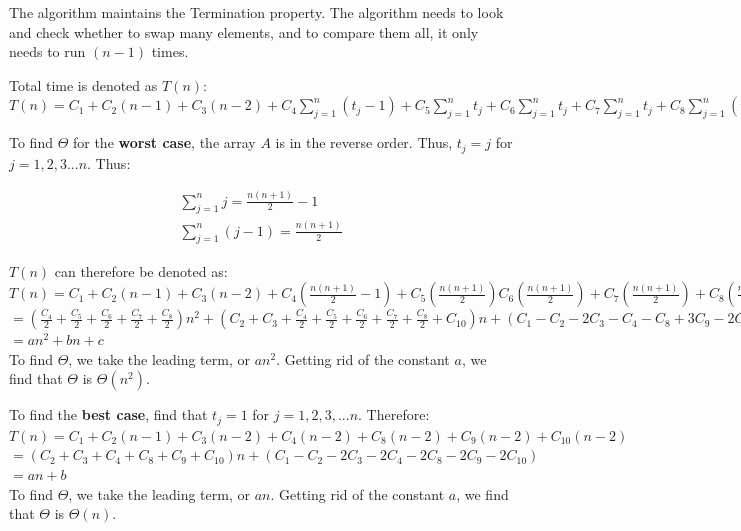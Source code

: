 \documentclass[11pt,letterpaper]{article}
\begin{document}
The algorithm maintains the Termination property. The algorithm needs to look and check whether to swap
many elements, and to compare them all, it only needs to run $ (n - 1) $ times.

Total time is denoted as $T(n)$:\\
$
	T(n)		= C_1 + C_2(n-1) + C_3(n-2) + C_4\sum_{j=1}^{n} (t_j - 1) + C_5\sum_{j=1}^{n} t_j
			+ C_6\sum_{j=1}^{n} t_j + C_7\sum_{j=1}^{n} t_j + C_8\sum_{j=1}^{n} (t_j - 1) + C_9(n-2) + C_{10}(n-2)
$

To find $ \Theta $ for the \textbf{worst case}, the array $ A $ is in the reverse order. Thus, $ t_j = j $ 
for $ j = 1, 2, 3... n $. Thus:

\begin{eqnarray}
	\sum_{j = 1}^{n} j = \frac{n ( n + 1 ) }{2} - 1 \\
	\sum_{j = 1}^{n} (j - 1) = \frac{n ( n + 1 ) }{2}
\end{eqnarray}

$T(n)$ can therefore be denoted as:\\
$
	T(n)		= C_1 + C_2(n-1) + C_3(n-2) + C_4( \frac{n(n+1)}{2} - 1) + C_5( \frac{n(n+1)}{2})
			C_6( \frac{n(n+1)}{2}) + C_7( \frac{n(n+1)}{2}) + C_8( \frac{n(n+1)}{2} - 1) + C_9(n-2) + C_{10}(n-2)
$ \\
$
= 	( \frac{C_4}{2} + \frac{C_5}{2} + \frac{C_6}{2} + \frac{C_7}{2} + \frac{C_8}{2} ) n^2
+	( C_2 + C_3 + \frac{C_4}{2} + \frac{C_5}{2} + \frac{C_6}{2} + \frac{C_7}{2} + \frac{C_8}{2} + C_{10}) n
+	( C_1 - C_2 - 2C_3 - C_4 - C_8 + 3C_9 - 2C_{10})
$\\
$
= an^2 + bn + c
$\\

To find $\Theta$, we take the leading term, or $an^2$. Getting rid of the constant $a$, we find that 
$\Theta$ is $\Theta(n^2)$.

To find the \textbf{best case}, find that $t_j = 1 $ for $ j = 1, 2, 3, ... n $. Therefore: \\
$
	T(n)		= C_1 + C_2(n-1) + C_3(n-2) + C_4(n - 2) + C_8(n - 2) + C_9(n-2) + C_{10}(n-2)
$ \\
$
			= ( C_2 + C_3 + C_4 + C_8 + C_9 + C_{10} ) n + ( C_1 - C_2 - 2C_3 - 2C_4 - 2C_8 - 2C_9
				-2C_{10})
$ \\
$
			= an + b
$\\

To find $\Theta$, we take the leading term, or $an$. Getting rid of the constant $a$, we find that 
$\Theta$ is $\Theta(n)$.
\end{document}
